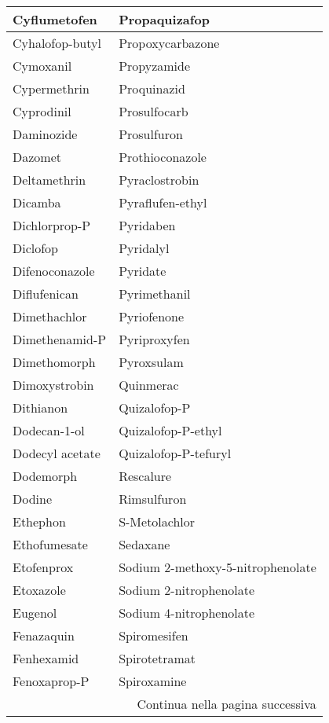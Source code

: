 \begin{small}
\begin{longtable}{|l|l|}
        Cyflumetofen & Propaquizafop \\ \hline
        Cyhalofop-butyl & Propoxycarbazone \\ \hline
        Cymoxanil & Propyzamide \\ \hline
        Cypermethrin & Proquinazid \\ \hline
        Cyprodinil & Prosulfocarb \\ \hline
        Daminozide & Prosulfuron \\ \hline
        Dazomet & Prothioconazole \\ \hline
        Deltamethrin & Pyraclostrobin \\ \hline
        Dicamba & Pyraflufen-ethyl \\ \hline
        Dichlorprop-P & Pyridaben \\ \hline
        Diclofop & Pyridalyl \\ \hline
        Difenoconazole & Pyridate \\ \hline
        Diflufenican & Pyrimethanil \\ \hline
        Dimethachlor & Pyriofenone \\ \hline
        Dimethenamid-P & Pyriproxyfen \\ \hline
        Dimethomorph & Pyroxsulam \\ \hline
        Dimoxystrobin & Quinmerac \\ \hline
        Dithianon & Quizalofop-P \\ \hline
        Dodecan-1-ol & Quizalofop-P-ethyl \\ \hline
        Dodecyl acetate & Quizalofop-P-tefuryl \\ \hline
        Dodemorph & Rescalure \\ \hline
        Dodine & Rimsulfuron \\ \hline
        Ethephon & S-Metolachlor \\ \hline
        Ethofumesate & Sedaxane \\ \hline
        Etofenprox & Sodium 2-methoxy-5-nitrophenolate \\ \hline
        Etoxazole & Sodium 2-nitrophenolate \\ \hline
        Eugenol & Sodium 4-nitrophenolate \\ \hline
        Fenazaquin & Spiromesifen \\ \hline
        Fenhexamid & Spirotetramat \\ \hline
        Fenoxaprop-P & Spiroxamine \\ \hline
        \multicolumn{2}{|r|}{{Continua nella pagina successiva}} \\ \hline

\end{longtable}
\end{small}
